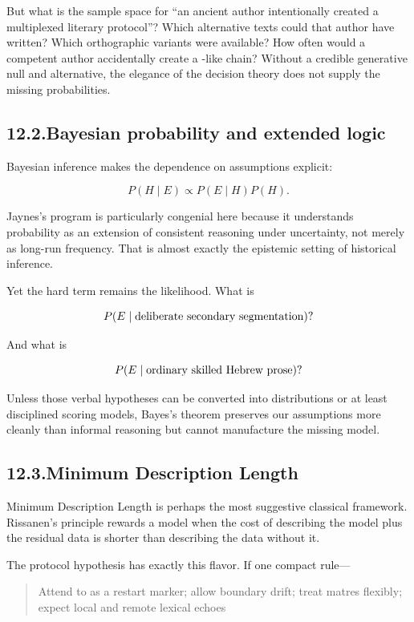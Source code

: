 But what is the sample space for ``an ancient author intentionally created a multiplexed literary protocol''?  Which alternative texts could that author have written?  Which orthographic variants were available?  How often would a competent author accidentally create a -like chain?  Without a credible generative null and alternative, the elegance of the decision theory does not supply the missing probabilities.

\subsection*{12.2.\quad Bayesian probability and extended logic}

Bayesian inference makes the dependence on assumptions explicit:

\[
P(H\mid E) \propto P(E\mid H)P(H).
\]

Jaynes's program is particularly congenial here because it understands probability as an extension of consistent reasoning under uncertainty, not merely as long-run frequency.\cite{Jaynes2003}  That is almost exactly the epistemic setting of historical inference.

Yet the hard term remains the likelihood.  What is

\[
P(E\mid \hbox{deliberate secondary segmentation})?
\]

And what is

\[
P(E\mid \hbox{ordinary skilled Hebrew prose})?
\]

Unless those verbal hypotheses can be converted into distributions or at least disciplined scoring models, Bayes's theorem preserves our assumptions more cleanly than informal reasoning but cannot manufacture the missing model.

\subsection*{12.3.\quad Minimum Description Length}

Minimum Description Length is perhaps the most suggestive classical framework.  Rissanen's principle rewards a model when the cost of describing the model plus the residual data is shorter than describing the data without it.\cite{Rissanen1978}

The protocol hypothesis has exactly this flavor.  If one compact rule---

\begin{quote}
Attend to  as a restart marker; allow boundary drift; treat matres flexibly; expect local and remote lexical echoes
\end{quote}

